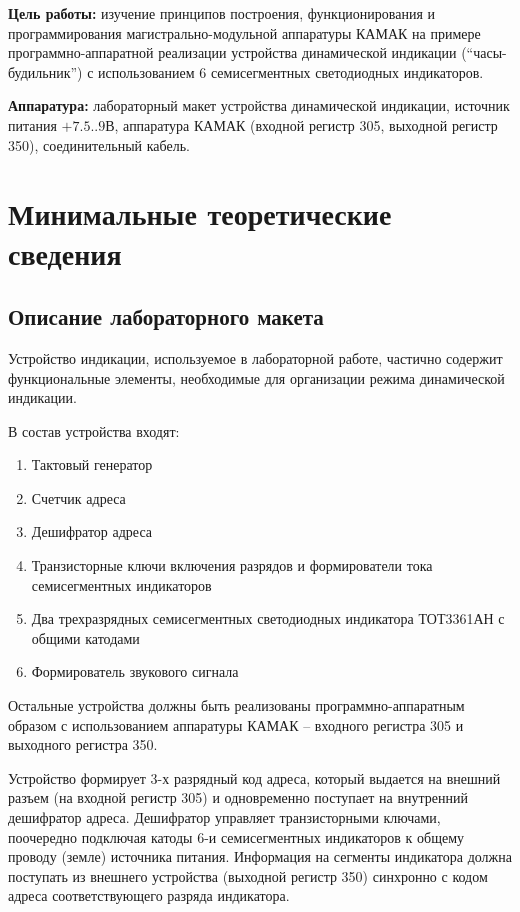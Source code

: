 \textbf{Цель работы:} изучение принципов построения, функционирования и программирования магистрально-модульной аппаратуры КАМАК на примере программно-аппаратной реализации устройства динамической индикации (\enquote{часы-будильник}) с использованием 6 семисегментных светодиодных индикаторов.

\textbf{Аппаратура:} лабораторный макет устройства динамической индикации, источник питания $+7.5..9\textrm{В}$, аппаратура КАМАК (входной регистр 305, выходной регистр 350), соединительный кабель.

\section{Минимальные теоретические сведения}

\subsection{Описание лабораторного макета}

Устройство индикации, используемое в лабораторной работе, частично содержит функциональные элементы, необходимые для организации режима динамической индикации.

В состав устройства входят:

\begin{enumerate}
\item Тактовый генератор
\item Счетчик адреса
\item Дешифратор адреса
\item Транзисторные ключи включения разрядов и формирователи тока семисегментных индикаторов
\item Два трехразрядных семисегментных светодиодных индикатора ТОТ3361АН с общими катодами
\item Формирователь звукового сигнала
\end{enumerate}

Остальные устройства должны быть реализованы программно-аппаратным образом с использованием аппаратуры КАМАК -- входного регистра 305 и выходного регистра 350.

Устройство формирует 3-х разрядный код адреса, который выдается на внешний разъем (на входной регистр 305) и одновременно поступает на внутренний дешифратор адреса. Дешифратор управляет транзисторными ключами, поочередно подключая катоды 6-и семисегментных индикаторов к общему проводу (земле) источника питания. Информация на сегменты индикатора должна поступать из внешнего устройства (выходной регистр 350) синхронно с кодом адреса соответствующего разряда индикатора.

